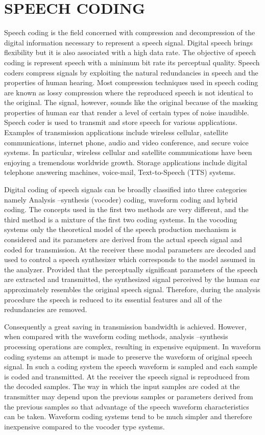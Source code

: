 \documentclass[a4paper,12pt]{report} %
\begin{document}
\section{SPEECH CODING}
Speech coding is the field concerned with compression and decompression of the digital information necessary to represent a speech signal. Digital speech brings flexibility but it is also associated with a high data rate. The objective of speech coding is represent speech with a minimum bit rate its perceptual quality. Speech coders compress signals by exploiting the natural redundancies in speech and the properties of human hearing. Most compression techniques used in speech coding are known as lossy compression where the reproduced speech is not identical to the original. The signal, however, sounds like the original because of the masking properties of human ear that render a level of certain types of noise inaudible. Speech coder is used to transmit and store speech for various applications. Examples of transmission applications include wireless cellular, satellite communications, internet phone, audio and video conference, and secure voice systems. In particular, wireless cellular and satellite communications have been enjoying a tremendous worldwide growth. Storage applications include digital telephone answering machines, voice-mail, Text-to-Speech (TTS) systems.\par
Digital coding of speech signals can be broadly classified into three categories namely Analysis –synthesis (vocoder) coding, waveform coding and hybrid coding. The concepts used in the first two methods are very different, and the third method is a mixture of the first two coding systems. In the vocoding systems only the theoretical model of the speech production mechanism is considered and its parameters are derived from the actual speech signal and coded for transmission. At the receiver these modal parameters are decoded and used to control a speech synthesizer which corresponds to the model assumed in the analyzer. Provided that the perceptually significant parameters of the speech are extracted and transmitted, the synthesized signal perceived by the human ear approximately resembles the original speech signal. Therefore, during the analysis procedure the speech is reduced to its essential features and all of the redundancies are removed.\par Consequently a great saving in transmission bandwidth is achieved. However, when compared with the waveform coding methods, analysis –synthesis processing operations are complex, resulting in expensive equipment. In waveform coding systems an attempt is made to preserve the waveform of original speech signal. In such a coding system the speech waveform is sampled and each sample is coded and transmitted. At the receiver the speech signal is reproduced from the decoded samples. The way in which the input samples are coded at the transmitter may depend upon the previous samples or parameters derived from the previous samples so that advantage of the speech waveform characteristics can be taken. Waveform coding systems tend to be much simpler and therefore inexpensive compared to the vocoder type systems.
\end{document}
